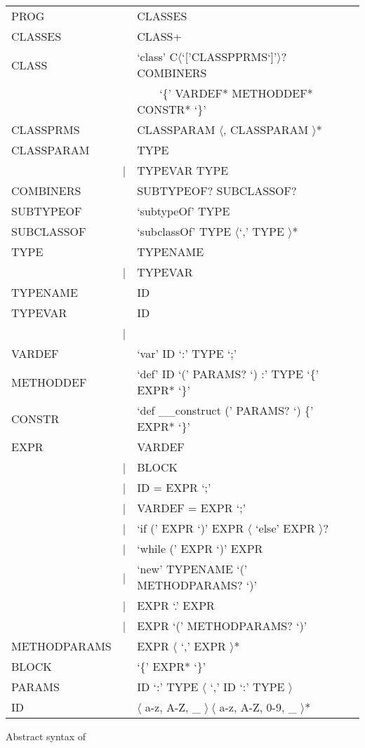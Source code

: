 \begin{listing}
	\begin{tabular}[H]{lrll}
		PROG & \lra & CLASSES \\
		CLASSES & \lra & CLASS+ \\
		CLASS & \lra & `class' C$\langle$`['CLASSPPRMS`]'$\rangle$? COMBINERS \\
		& & ~~~~`\{' VARDEF* METHODDEF* CONSTR* `\}' \\
		CLASSPRMS & \lra & CLASSPARAM $\langle$, CLASSPARAM $\rangle$* \\
		CLASSPARAM & \lra & TYPE \\
		 & | & TYPEVAR \match TYPE \\
		COMBINERS & \lra & SUBTYPEOF? SUBCLASSOF? \\
		SUBTYPEOF & \lra & `subtypeOf' TYPE \\
		SUBCLASSOF & \lra & `subclassOf' TYPE $\langle$`,' TYPE $\rangle$* \\
		TYPE & \lra & TYPENAME \\
		& | & TYPEVAR \\
		TYPENAME & \lra & ID \\
		TYPEVAR & \lra & ID \\
		& | & \mytype \\
		VARDEF & \lra & `var' ID `:' TYPE `;' \\
		METHODDEF & \lra & `def' ID `(' PARAMS? `) :' TYPE `\{' EXPR* `\}' \\
		CONSTR & \lra & `def \_\_construct (' PARAMS? `) \{' EXPR* `\}' \\
		EXPR & \lra & VARDEF \\
		& | & BLOCK \\
		& | & ID = EXPR `;' \\
		& | & VARDEF = EXPR `;' \\
		& | & `if (' EXPR `)' EXPR $\langle$ `else' EXPR $\rangle$? \\
		& | & `while (' EXPR `)' EXPR \\
		& | & `new' TYPENAME `(' METHODPARAMS? `)' \\
		& | & EXPR `.' EXPR \\
		& | & EXPR `(' METHODPARAMS? `)' \\
		METHODPARAMS & \lra & EXPR $\langle$ `,' EXPR $\rangle$* \\
		BLOCK & \lra & `\{' EXPR* `\}' \\
		PARAMS & \lra & ID `:' TYPE $\langle$ `,' ID `:' TYPE $\rangle$ \\
		ID & \lra & $\langle$ a-z, A-Z, \_ $\rangle~\langle$ a-z, A-Z, 0-9, \_ $\rangle$*
	\end{tabular}
	\caption{Abstract syntax of \ooplss}
	\label{lst:abstractSyntax}
\end{listing}

